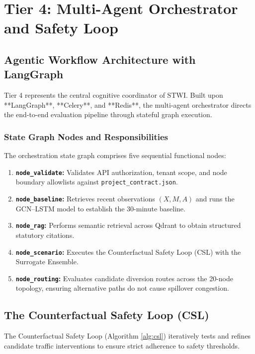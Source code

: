 \chapter{Tier 4: Multi-Agent Orchestrator and Safety Loop}
\label{chapter:tier4}

\section{Agentic Workflow Architecture with LangGraph}
Tier 4 represents the central cognitive coordinator of STWI. Built upon **LangGraph**, **Celery**, and **Redis**, the multi-agent orchestrator directs the end-to-end evaluation pipeline through stateful graph execution.

\subsection{State Graph Nodes and Responsibilities}
The orchestration state graph comprises five sequential functional nodes:
\begin{enumerate}[leftmargin=1.5cm, label=\textbf{\arabic*.}]
  \item \textbf{\texttt{node\_validate}:} Validates API authorization, tenant scope, and node boundary allowlists against \texttt{project\_contract.json}.
  \item \textbf{\texttt{node\_baseline}:} Retrieves recent observations $(X, M, A)$ and runs the GCN--LSTM model to establish the 30-minute baseline.
  \item \textbf{\texttt{node\_rag}:} Performs semantic retrieval across Qdrant to obtain structured statutory citations.
  \item \textbf{\texttt{node\_scenario}:} Executes the Counterfactual Safety Loop (CSL) with the Surrogate Ensemble.
  \item \textbf{\texttt{node\_routing}:} Evaluates candidate diversion routes across the 20-node topology, ensuring alternative paths do not cause spillover congestion.
\end{enumerate}

\section{The Counterfactual Safety Loop (CSL)}
The Counterfactual Safety Loop (Algorithm \ref{alg:csl}) iteratively tests and refines candidate traffic interventions to ensure strict adherence to safety thresholds.

